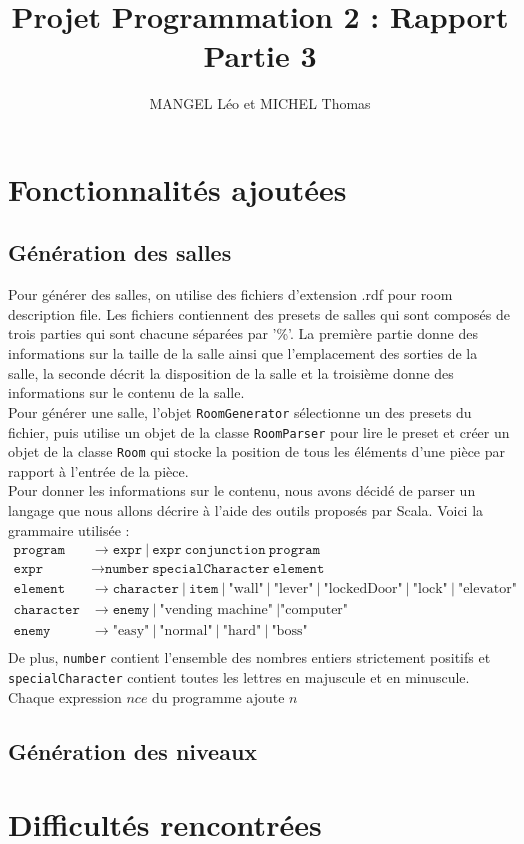 \documentclass[10pt,a4paper]{article}
\title{Projet Programmation 2 : Rapport Partie 3}
\author{MANGEL Léo et MICHEL Thomas}
\date{}
\begin{document}
\maketitle

\section{Fonctionnalités ajoutées}

\subsection{Génération des salles}

Pour générer des salles, on utilise des fichiers d'extension .rdf pour room description file. Les fichiers contiennent des presets de salles qui sont composés de trois parties qui sont chacune séparées par '\%'. La première partie donne des informations sur la taille de la salle ainsi que l'emplacement des sorties de la salle, la seconde décrit la disposition de la salle et la troisième donne des informations sur le contenu de la salle.\\
Pour générer une salle, l'objet \texttt{RoomGenerator} sélectionne un des presets du fichier, puis utilise un objet de la classe \texttt{RoomParser} pour lire le preset et créer un objet de la classe \texttt{Room} qui stocke la position de tous les éléments d'une pièce par rapport à l'entrée de la pièce.\\
Pour donner les informations sur le contenu, nous avons décidé de parser un langage que nous allons décrire à l'aide des outils proposés par Scala. Voici la grammaire utilisée :\\
\begin{align*}
	\texttt{program} &\to \texttt{expr}\ |\ \texttt{expr}\ \texttt{conjunction}\ \texttt{program}\\
	\texttt{expr} &\to \texttt{number}\ \texttt{specialCharacter}\ \texttt{element}\\
	\texttt{element} &\to \texttt{character}\ |\ \texttt{item}\ |\ \mbox{"wall"}\ |\ \mbox{"lever"}\ |\ \mbox{"lockedDoor"}\ |\ \mbox{"lock"}\ |\ \mbox{"elevator"}\\
	\texttt{character} &\to \texttt{enemy}\ |\ \mbox{"vending machine"}\ | \mbox{"computer"}\\
	\texttt{enemy} &\to \mbox{"easy"}\ |\ \mbox{"normal"}\ |\ \mbox{"hard"}\ |\ \mbox{"boss"}\\
\end{align*}
De plus, \texttt{number} contient l'ensemble des nombres entiers strictement positifs et \texttt{specialCharacter} contient toutes les lettres en majuscule et en minuscule.\\
Chaque expression $n c e$ du programme ajoute $n$ 


\subsection{Génération des niveaux}

\section{Difficultés rencontrées}
\end{document}
